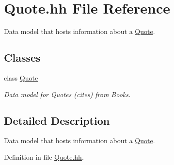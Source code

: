 \hypertarget{_quote_8hh}{\section{Quote.\+hh File Reference}
\label{_quote_8hh}
}


Data model that hosts information about a \hyperlink{class_quote}{Quote}.  


\subsection*{Classes}
\begin{DoxyCompactItemize}
\item 
class \hyperlink{class_quote}{Quote}
\begin{DoxyCompactList}\small\item\em Data model for Quotes (cites) from Books. \end{DoxyCompactList}\end{DoxyCompactItemize}


\subsection{Detailed Description}
Data model that hosts information about a \hyperlink{class_quote}{Quote}. 



Definition in file \hyperlink{_quote_8hh_source}{Quote.\+hh}.

